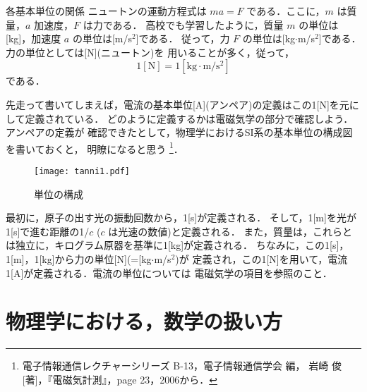             \begin{memo}{各基本単位の関係}
            ニュートンの運動方程式は $ma=F$ である．ここに，$m$ は質量，$a$ 加速度，$F$ は力である．
            高校でも学習したように，質量 $m$ の単位は[kg]，加速度 $a$ の単位は[m/s${}^{2}$]である．
            従って，力 $F$ の単位は[kg$\cdot$m/s${}^{2}$]である．力の単位としては[N](ニュートン)を
            用いることが多く，従って，
                \begin{equation*}
                    1[\mathrm{N}]=1[\mathrm{kg}\cdot\mathrm{m}/\mathrm{s}^{2}]
                \end{equation*}
            である．

            先走って書いてしまえば，電流の基本単位[A](アンペア)の定義はこの1[N]を元にして定義されている．
            どのように定義するかは電磁気学の部分で確認しよう．アンペアの定義が
            確認できたとして，物理学におけるSI系の基本単位の構成図を書いておくと，
            明瞭になると思う
                \footnote{
                    電子情報通信レクチャーシリーズ B-13，電子情報通信学会 編，
                    岩崎 俊 [著]，『電磁気計測』，page 23，2006から．
                }．
                \begin{figure}[hbt]
                    \begin{center}
                        \texttt{[image: tanni1.pdf]}
                        \caption{単位の構成}
                        \label{fig:tanni1}
                    \end{center}
                \end{figure}

            最初に，原子の出す光の振動回数から，1[s]が定義される．
            そして，1[m]を光が1[s]で進む距離の1/$c$ ($c$ は光速の数値)と定義される．
            また，質量は，これらとは独立に，キログラム原器を基準に1[kg]が定義される．
            ちなみに，この1[s]，1[m]，1[kg]から力の単位[N](=[kg$\cdot$m/s${}^{2}$)が
            定義され，この1[N]を用いて，電流1[A]が定義される．電流の単位については
            電磁気学の項目を参照のこと．
            \end{memo}

    \section{物理学における，数学の扱い方}
